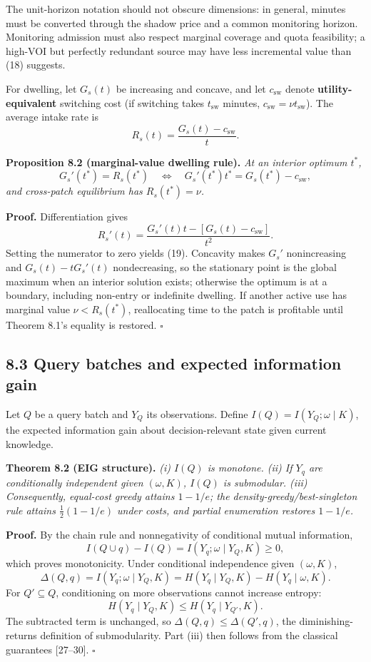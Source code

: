 \documentclass[
  11pt]{article}
\begin{document}
The unit-horizon notation should not obscure dimensions: in general, minutes must be converted through the shadow price and a common monitoring horizon. Monitoring admission must also respect marginal coverage and quota feasibility; a high-VOI but perfectly redundant source may have less incremental value than (18) suggests.

For dwelling, let \(G_s(t)\) be increasing and concave, and let \(c_{\mathrm{sw}}\) denote \textbf{utility-equivalent} switching cost (if switching takes \(t_{\mathrm{sw}}\) minutes, \(c_{\mathrm{sw}}=\nu t_{\mathrm{sw}}\)). The average intake rate is \[
R_s(t)=\frac{G_s(t)-c_{\mathrm{sw}}}{t}.
\]

\textbf{Proposition 8.2 (marginal-value dwelling rule).} \emph{At an interior optimum \(t^*\),} \[
G_s'(t^*)=R_s(t^*)
\quad\Longleftrightarrow\quad
G_s'(t^*)t^*=G_s(t^*)-c_{\mathrm{sw}},
\tag{19}
\] \emph{and cross-patch equilibrium has \(R_s(t^*)=\nu\).}

\textbf{Proof.} Differentiation gives \[
R_s'(t)=\frac{G_s'(t)t-[G_s(t)-c_{\mathrm{sw}}]}{t^2}.
\] Setting the numerator to zero yields (19). Concavity makes \(G_s'\) nonincreasing and \(G_s(t)-tG_s'(t)\) nondecreasing, so the stationary point is the global maximum when an interior solution exists; otherwise the optimum is at a boundary, including non-entry or indefinite dwelling. If another active use has marginal value \(\nu<R_s(t^*)\), reallocating time to the patch is profitable until Theorem 8.1's equality is restored. \(\square\)

\subsection{8.3 Query batches and expected information gain}\label{query-batches-and-expected-information-gain}

Let \(Q\) be a query batch and \(Y_Q\) its observations. Define \(I(Q)=I(Y_Q;\omega\mid K)\), the expected information gain about decision-relevant state given current knowledge.

\textbf{Theorem 8.2 (EIG structure).} \emph{(i) \(I(Q)\) is monotone. (ii) If \(Y_q\) are conditionally independent given \((\omega,K)\), \(I(Q)\) is submodular. (iii) Consequently, equal-cost greedy attains \(1-1/e\); the density-greedy/best-singleton rule attains \(\tfrac12(1-1/e)\) under costs, and partial enumeration restores \(1-1/e\).}

\textbf{Proof.} By the chain rule and nonnegativity of conditional mutual information, \[
I(Q\cup q)-I(Q)=I(Y_q;\omega\mid Y_Q,K)\geq0,
\] which proves monotonicity. Under conditional independence given \((\omega,K)\), \[
\Delta(Q,q)=I(Y_q;\omega\mid Y_Q,K)
=H(Y_q\mid Y_Q,K)-H(Y_q\mid\omega,K).
\] For \(Q'\subseteq Q\), conditioning on more observations cannot increase entropy: \[
H(Y_q\mid Y_Q,K)\leq H(Y_q\mid Y_{Q'},K).
\] The subtracted term is unchanged, so \(\Delta(Q,q)\leq\Delta(Q',q)\), the diminishing-returns definition of submodularity. Part (iii) then follows from the classical guarantees {[}27--30{]}. \(\square\)
\end{document}
